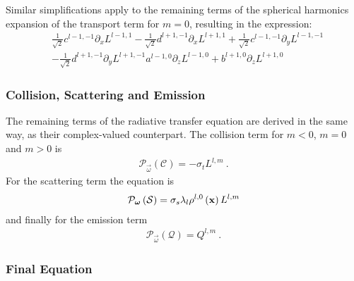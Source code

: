 Similar simplifications apply to the remaining terms of the spherical harmonics expansion of the transport term for $m=0$, resulting in the expression:
\begin{align}
\label{eq:pn_rvalued_transport_m0}
&
\frac{1}{\sqrt{2}}c^{{l-1,-1}}\partial_x L^{{l-1,1}}
-\frac{1}{\sqrt{2}}d^{{l+1,-1}}\partial_x L^{{l+1,1}}
+\frac{1}{\sqrt{2}}c^{{l-1,-1}}\partial_y L^{{l-1,-1}}
\nonumber\\&
-\frac{1}{\sqrt{2}}d^{{l+1,-1}}\partial_y L^{{l+1,-1}}
a^{{l-1,0}}\partial_z L^{{l-1,0}}
+b^{{l+1,0}}\partial_z L^{{l+1,0}}
\end{align}

\subsubsection*{Collision, Scattering and Emission}

The remaining terms of the radiative transfer equation are derived in the same way, as their complex-valued counterpart. The collision term for $m < 0$, $m=0$ and $m > 0$ is
\begin{align}
\label{eq:pn_rvalued_transport_collision}
\mathcal{P}_{\vec{\omega}}\left(\mathcal{C}\right)
=
-\sigma_t L^{l,m}
\ .
\end{align}
For the scattering term the equation is
\begin{align}
\label{eq:pn_rvalued_transport_scattering}
\mathcal{P}_{\boldsymbol{\mathbf{\omega}}}\left(\mathcal{S}\right)
=
\sigma_s\lambda_{l}\rho^{l,0}\left(\boldsymbol{\mathbf{x}}\right)L^{l,m}
\end{align}
and finally for the emission term
\begin{align}
\label{eq:pn_rvalued_transport_emission}
\mathcal{P}_{\vec{\omega}}\left(\mathcal{Q}\right)
=
Q^{l,m}
\ .
\end{align}

\subsubsection*{Final Equation}

